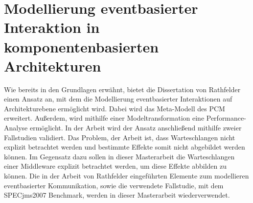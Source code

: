 \section{Modellierung eventbasierter Interaktion in komponentenbasierten Architekturen}
Wie bereits in den Grundlagen erwähnt, bietet die Dissertation von Rathfelder \cite{Rathfelder2013} einen Ansatz an, mit dem die Modellierung eventbasierter Interaktionen auf Architekturebene ermöglicht wird. Dabei wird das Meta-Modell des PCM erweitert. Außerdem, wird mithilfe einer Modeltransformation eine Performance-Analyse ermöglicht. In der Arbeit wird der Ansatz anschließend mithilfe zweier Fallstudien validiert. Das Problem, der Arbeit ist, dass Warteschlangen nicht explizit betrachtet werden und bestimmte Effekte somit nicht abgebildet werden können. Im Gegensatz dazu sollen in dieser Masterarbeit die Warteschlangen einer Middleware explizit betrachtet werden, um diese Effekte abbilden zu können. Die in der Arbeit von Rathfelder eingeführten Elemente zum modellieren eventbasierter Kommunikation, sowie die verwendete Fallstudie, mit dem SPECjms2007 Benchmark, werden in dieser Masterarbeit wiederverwendet.